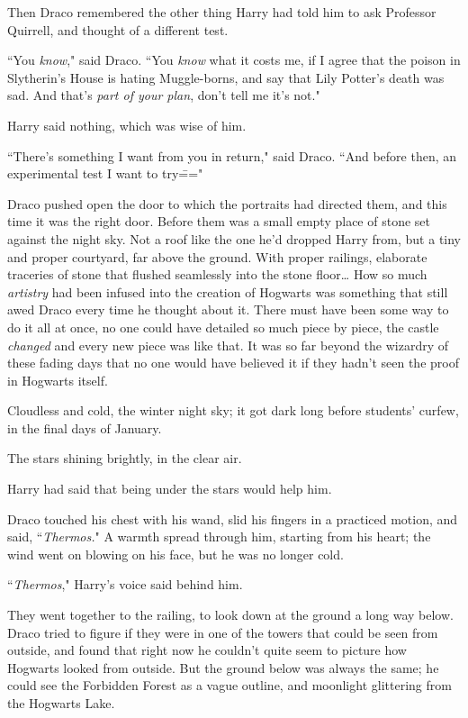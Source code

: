 Then Draco remembered the other thing Harry had told him to ask Professor Quirrell, and thought of a different test.

``You \emph{know}," said Draco. ``You \emph{know} what it costs me, if I agree that the poison in Slytherin's House is hating Muggle-borns, and say that Lily Potter's death was sad. And that's \emph{part of your plan}, don't tell me it's not."

Harry said nothing, which was wise of him.

``There's something I want from you in return," said Draco. ``And before then, an experimental test I want to try\==="

\later

Draco pushed open the door to which the portraits had directed them, and this time it was the right door. Before them was a small empty place of stone set against the night sky. Not a roof like the one he'd dropped Harry from, but a tiny and proper courtyard, far above the ground. With proper railings, elaborate traceries of stone that flushed seamlessly into the stone floor{\ldots} How so much \emph{artistry} had been infused into the creation of Hogwarts was something that still awed Draco every time he thought about it. There must have been some way to do it all at once, no one could have detailed so much piece by piece, the castle \emph{changed} and every new piece was like that. It was so far beyond the wizardry of these fading days that no one would have believed it if they hadn't seen the proof in Hogwarts itself.

Cloudless and cold, the winter night sky; it got dark long before students' curfew, in the final days of January.

The stars shining brightly, in the clear air.

Harry had said that being under the stars would help him.

Draco touched his chest with his wand, slid his fingers in a practiced motion, and said, ``\emph{Thermos.}" A warmth spread through him, starting from his heart; the wind went on blowing on his face, but he was no longer cold.

``\emph{Thermos}," Harry's voice said behind him.

They went together to the railing, to look down at the ground a long way below. Draco tried to figure if they were in one of the towers that could be seen from outside, and found that right now he couldn't quite seem to picture how Hogwarts looked from outside. But the ground below was always the same; he could see the Forbidden Forest as a vague outline, and moonlight glittering from the Hogwarts Lake.

